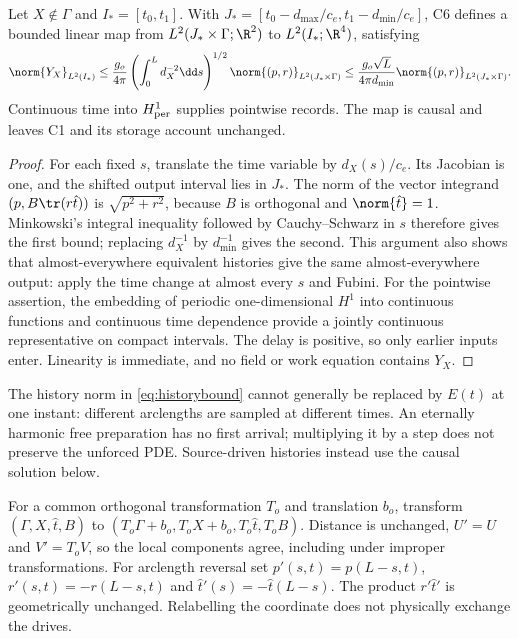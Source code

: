 \begin{theorem}\label{thm:history}
Let $X\notin\Gamma$ and $I_*=[t_0,t_1]$. With
$J_*=[t_0-d_{\max}/c_e,t_1-d_{\min}/c_e]$, C6 defines a bounded linear map from $L^2(J_*\times\Gamma;\R^2)$ to $L^2(I_*;\R^4)$, satisfying
\begin{equation}\label{eq:historybound}
 \norm{Y_X}_{L^2(I_*)}
 \le\frac{g_o}{4\pi}\left(\int_0^L d_X^{-2}\dd s\right)^{1/2}
 \norm{(p,r)}_{L^2(J_*\times\Gamma)}
 \le\frac{g_o\sqrt L}{4\pi d_{\min}}\norm{(p,r)}_{L^2(J_*\times\Gamma)}.
\end{equation}
Continuous time into $H^1_{\rm per}$ supplies pointwise records. The map is causal and leaves C1 and its storage account unchanged.
\end{theorem}
\begin{proof}
For each fixed $s$, translate the time variable by $d_X(s)/c_e$. Its Jacobian is one, and the shifted output interval lies in $J_*$. The norm of the vector integrand $(p,B\tr(r\hat t))$ is $\sqrt{p^2+r^2}$, because $B$ is orthogonal and $\norm{\hat t}=1$. Minkowski's integral inequality followed by Cauchy--Schwarz in $s$ therefore gives the first bound; replacing $d_X^{-1}$ by $d_{\min}^{-1}$ gives the second. This argument also shows that almost-everywhere equivalent histories give the same almost-everywhere output: apply the time change at almost every $s$ and Fubini. For the pointwise assertion, the embedding of periodic one-dimensional $H^1$ into continuous functions and continuous time dependence provide a jointly continuous representative on compact intervals. The delay is positive, so only earlier inputs enter. Linearity is immediate, and no field or work equation contains $Y_X$.
\end{proof}

The history norm in \eqref{eq:historybound} cannot generally be replaced by $E(t)$ at one instant: different arclengths are sampled at different times. An eternally harmonic free preparation has no first arrival; multiplying it by a step does not preserve the unforced PDE. Source-driven histories instead use the causal solution below.

For a common orthogonal transformation $T_o$ and translation $b_o$, transform $(\Gamma,X,\hat t,B)$ to $(T_o\Gamma+b_o,T_oX+b_o,T_o\hat t,T_oB)$. Distance is unchanged, $U'=U$ and $V'=T_oV$, so the local components agree, including under improper transformations. For arclength reversal set $p'(s,t)=p(L-s,t)$, $r'(s,t)=-r(L-s,t)$ and $\hat t'(s)=-\hat t(L-s)$. The product $r'\hat t'$ is geometrically unchanged. Relabelling the coordinate does not physically exchange the drives.

